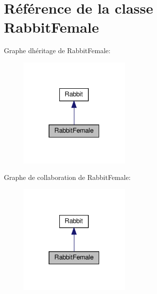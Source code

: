 \hypertarget{classRabbitFemale}{}\section{Référence de la classe Rabbit\+Female}
\label{classRabbitFemale}


Graphe d\textquotesingle{}héritage de Rabbit\+Female\+:\nopagebreak
\begin{figure}[H]
\begin{center}
\leavevmode
\includegraphics[width=157pt]{classRabbitFemale__inherit__graph}
\end{center}
\end{figure}


Graphe de collaboration de Rabbit\+Female\+:\nopagebreak
\begin{figure}[H]
\begin{center}
\leavevmode
\includegraphics[width=157pt]{classRabbitFemale__coll__graph}
\end{center}
\end{figure}
